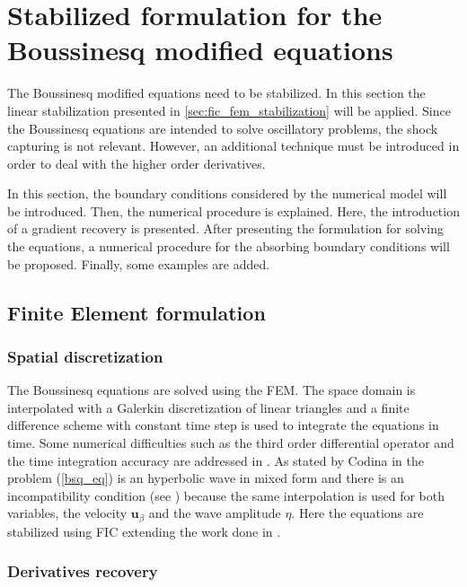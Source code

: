 \section{Stabilized formulation for the Boussinesq modified equations}


The Boussinesq modified equations need to be stabilized. In this section the linear stabilization presented in \ref{sec:fic_fem_stabilization} will be applied. Since the Boussinesq equations are intended to solve oscillatory problems, the shock capturing is not relevant. However, an additional technique must be introduced in order to deal with the higher order derivatives.

In this section, the boundary conditions considered by the numerical model will be introduced. Then, the numerical procedure is explained. Here, the introduction of a gradient recovery is presented. After presenting the formulation for solving the equations, a numerical procedure for the absorbing boundary conditions will be proposed. Finally, some examples are added.





\subsection{Finite Element formulation}

\subsubsection{Spatial discretization}

The Boussinesq equations are solved using the FEM. The space domain is interpolated with a Galerkin discretization of linear triangles and a finite difference scheme with constant time step is used to integrate the equations in time.
Some numerical difficulties such as the third order differential operator and the time integration accuracy are addressed in \cite{walkley2002,woo2004a,wei1995}.
As stated by Codina in \cite{codina2008,codina2008b} the problem (\ref{bsq_eq}) is an hyperbolic wave in mixed form and there is an incompatibility condition (see \cite{BrezziFortin}) because the same interpolation is used for both variables, the velocity $\mathbf{u}_\beta$ and the wave amplitude $\eta$.
Here the equations are stabilized using FIC extending the work done in \cite{maso2022}.


\subsubsection{Derivatives recovery}

